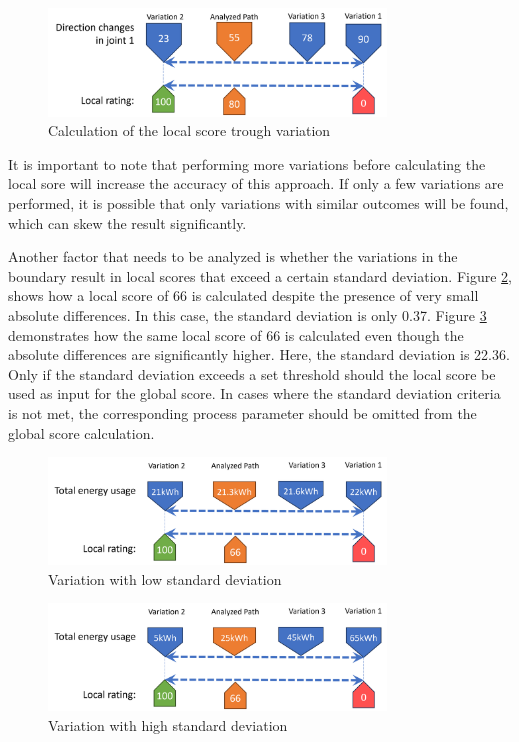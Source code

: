 \begin{figure}[H]
	\centerline{\includegraphics[width=0.8\textwidth]{figures/localscore.png}}
	\caption{Calculation of the local score trough variation}
	\label{Localscore}
\end{figure}

It is important to note that performing more variations before calculating the local sore will increase the accuracy of this approach. If only a few variations are performed, it is possible that only variations with similar outcomes will be found, which can skew the result significantly.

Another factor that needs to be analyzed is whether the variations in the boundary result in local scores that exceed a certain standard deviation. Figure \ref{lowstd}, shows how a local score of 66 is calculated despite the presence of very small absolute differences. In this case, the standard deviation is only 0.37. Figure \ref{highstd} demonstrates how the same local score of 66 is calculated even though the absolute differences are significantly higher. Here, the standard deviation is 22.36. Only if the standard deviation exceeds a set threshold should the local score be used as input for the global score. In cases where the standard deviation criteria is not met, the corresponding process parameter should be omitted from the global score calculation.

\begin{figure}[H]
	\centerline{\includegraphics[width=0.8\textwidth]{figures/lowstd.png}}
	\caption{Variation with low standard deviation}
	\label{lowstd}
\end{figure}

\begin{figure}[H]
	\centerline{\includegraphics[width=0.8\textwidth]{figures/highstd.png}}
	\caption{Variation with high standard deviation}
	\label{highstd}
\end{figure}

